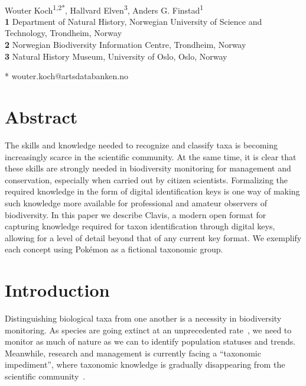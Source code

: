 \documentclass[10pt,letterpaper]{article}
\begin{document}
\vspace*{0.2in}

\begin{flushleft}
{\Large
\textbf{}
}
\newline
\\
Wouter Koch\textsuperscript{1,2*},
Hallvard Elven\textsuperscript{3},
Anders G. Finstad\textsuperscript{1}
\\
\bigskip
\textbf{1} Department of Natural History, Norwegian University of Science and Technology, Trondheim, Norway
\\
\textbf{2} Norwegian Biodiversity Information Centre, Trondheim, Norway
\\
\textbf{3} Natural History Museum, University of Oslo, Oslo, Norway
\\
\bigskip

* wouter.koch@artsdatabanken.no

\end{flushleft}
\newpage
\section*{
Abstract
}
The skills and knowledge needed to recognize and classify taxa is becoming increasingly scarce in the scientific community. At the same time, it is clear that these skills are strongly needed in biodiversity monitoring for management and conservation, especially when carried out by citizen scientists. Formalizing the required knowledge in the form of digital identification keys is one way of making such knowledge more available for professional and amateur observers of biodiversity. In this paper we describe Clavis, a modern open format for capturing knowledge required for taxon identification through digital keys, allowing for a level of detail beyond that of any current key format. We exemplify each concept using Pokémon as a fictional taxonomic group.
\linenumbers
\section*{
Introduction
}
Distinguishing biological taxa from one another is a necessity in biodiversity monitoring. As species are going extinct at an unprecedented rate~\cite{Ceballos2015, Johnson2017}, we need to monitor as much of nature as we can to identify population statuses and trends. Meanwhile, research and management is currently facing a ``taxonomic impediment'', where taxonomic knowledge is gradually disappearing from the scientific community~\cite{Engel2021}.
\end{document}
